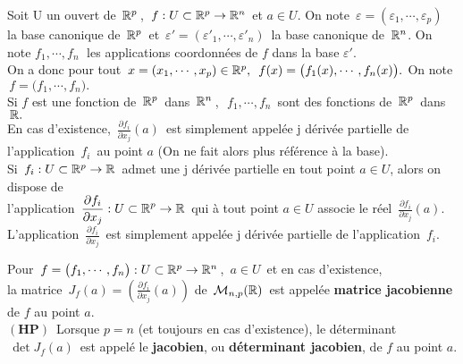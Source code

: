 \vspace{1.3cm}

Soit U un ouvert de \(\,\mathbb{R}^p\,\), \(\,f:U\subset \mathbb{R}^p\to \mathbb{R}^n\,\) et \(a\in U\). On note \(\,\varepsilon=(\varepsilon_1,\cdots,\varepsilon_p)\,\) la base canonique de \(\,\mathbb{R}^p\,\) et \(\,\varepsilon'=(\varepsilon'_1,\cdots,\varepsilon'_n)\,\) la base canonique de \(\,\mathbb{R}^n\). On note \(f_1,\cdots,f_n\;\) les applications coordonnées de $f$ dans la base $\varepsilon'$. \\
On a donc pour tout \(\, x=(x_1,\cdots,x_p)\in \mathbb{R}^p,\ \,f(x)=\bigl(f_1(x),\cdots,f_n(x)\bigr).\) On note \(\,f=\bigl(f_1,\cdots,f_n\bigr).\)\\
Si $f$ est une fonction de \(\,\mathbb{R}^p\,\) dans \(\,\mathbb{R}^n\,\),\ \(\,f_1,\cdots,f_n\,\) sont des fonctions de \(\,\mathbb{R}^p\,\) dans \(\,\mathbb{R}.\)\vspace{0.1cm}\\
En cas d'existence, \(\,\displaystyle\frac{\partial f_i}{\partial x_j}(a)\,\) est simplement appelée j dérivée partielle de l'application $\,f_i\,$ au point $a$ (On ne fait alors plus référence à la base).\vspace{0.1cm}\\
Si \(\,f_i:U\subset \mathbb{R}^p\to \mathbb{R}\,\) admet une j dérivée partielle en tout point \(a\in U\), alors on dispose de\vspace{0.1cm}\\
l'application \(\,\displaystyle\frac{\partial f_i}{\partial x_j}:U\subset \mathbb{R}^p\to \mathbb{R}\,\) qui à tout point \(a\in U\) associe le réel \(\,\displaystyle\frac{\partial f_i}{\partial x_j}(a).\)\vspace{0.1cm}\\
L'application \(\,\displaystyle\frac{\partial f_i}{\partial x_j}\,\) est simplement appelée j dérivée partielle de l'application $\,f_i$.

\newpage

Pour \(\,f=\bigl(f_1,\cdots,f_n\bigr):U\subset \mathbb{R}^p\to \mathbb{R}^n\,\), $\,a\in U\,$ et en cas d'existence,\vspace{0.2cm}\\
la matrice \(\,\displaystyle J_f(a)=\left(\frac{\partial f_i}{\partial x_j}(a)\!\right)\) de \(\,\mathcal{M}_{n,p}(\mathbb{R})\,\) est appelée \textbf{matrice jacobienne} de $f$ au point $a$.\vspace{0.2cm}\\
$\left(\mathbf{HP}\right)\,$ Lorsque $p=n$ (et toujours en cas d'existence), le déterminant $\,\det J_f(a)\,$ est appelé le \textbf{jacobien}, ou \textbf{déterminant jacobien}, de $f$ au point $a$.

